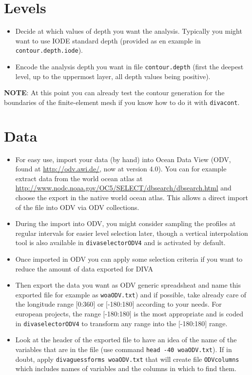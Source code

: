 \documentclass[8pt,a4paper,notitlepage]{book}
\newcommand{\diva}{DIVA}
\begin{document}
\section{Levels}

\begin{itemize}
\item Decide at which values of depth you want the analysis. Typically you might want to use IODE standard depth (provided as en example in {\tt contour.depth.iode}).
\item Encode the analysis depth you want in file {\tt contour.depth} (first the deepest level, up to the uppermost layer, all depth values being positive).
\end{itemize}

{\bf NOTE}: At this point you can already test the contour generation for the boundaries of the finite-element mesh if you know how to do it with {\tt divacont}.

\section{Data}


\begin{itemize}
\item
For easy use, import your data (by hand) into Ocean Data View (ODV, found at \url{http://odv.awi.de/}, now at version 4.0). You can for example extract data from the world ocean atlas at \url{http://www.nodc.noaa.gov/OC5/SELECT/dbsearch/dbsearch.html} and choose the export in the native world ocean atlas. This allows a direct import of the file into ODV via ODV collections.
\item During the import into ODV, you might consider sampling the profiles at regular intervals for easier level selection later, though a vertical interpolation tool is also available in {\tt divaselectorODV4} and is activated by default.
\item Once imported in ODV you can apply some selection criteria if you want to reduce the amount of data exported for \diva 
\item Then export the data you want as ODV generic spreadsheat and name this exported file for example as {\tt woaODV.txt}) and if possible, take already care of the longitude range  $[$0:360$]$ or $[$-180:180$]$ according to your needs. For european projects, the range $[$-180:180$]$  is the most appropriate and is coded in {\tt divaselectorODV4} to transform any range into the $[$-180:180$]$ range.
\item Look at the header of the exported file to have an idea of the name of the variables that are in the file (use command {\tt head -40 woaODV.txt}). If in doubt, apply {\tt divaguessforms woaODV.txt} that will create file {\tt ODVcolumns} which includes names of variables and the columns in which to find them.
\end{itemize}
\end{document}

